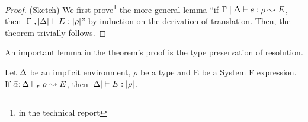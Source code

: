 




\thmtranstypreserve
\begin{proof} (Sketch)
  We first prove\footnote{in the technical report} the more general lemma ``if $\Gamma \mid \Delta \vdash
  e:\rho \leadsto E$, then $|\Gamma|,|\Delta| \vdash
  E:|\rho|$'' by induction on the derivation of
  translation. Then, the theorem trivially follows.
\end{proof}

An important lemma in the theorem's proof is the type preservation of 
resolution.
\begin{lemma}
Let $\Delta$ be an implicit environment, $\rho$ be a type and E be a System F expression.
If $\bar{\alpha};\Delta \vdash_r \rho \leadsto E$, then $|\Delta| \vdash E : |\rho|$.
\end{lemma}

